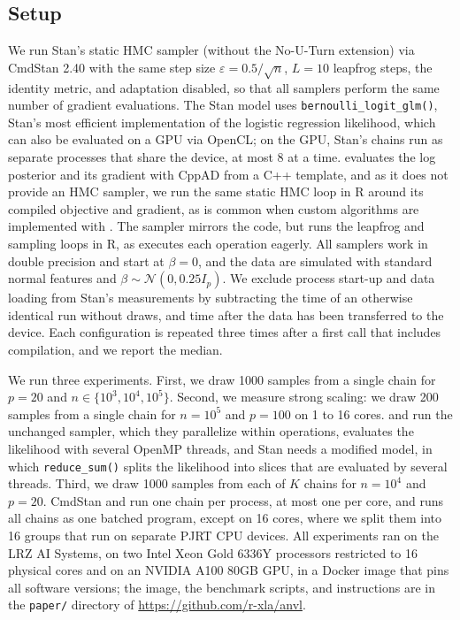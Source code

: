 \subsection{Setup}\label{setup}

We run Stan's static HMC sampler (without the No-U-Turn extension) via CmdStan 2.40 with the same step size \(\varepsilon = 0.5/\sqrt{n}\), \(L = 10\) leapfrog steps, the identity metric, and adaptation disabled, so that all samplers perform the same number of gradient evaluations.
The Stan model uses \texttt{bernoulli\_logit\_glm()}, Stan's most efficient implementation of the logistic regression likelihood, which can also be evaluated on a GPU via OpenCL; on the GPU, Stan's chains run as separate processes that share the device, at most 8 at a time.
 evaluates the log posterior and its gradient with CppAD from a C++ template, and as it does not provide an HMC sampler, we run the same static HMC loop in R around its compiled objective and gradient, as is common when custom algorithms are implemented with .
The  sampler mirrors the  code, but runs the leapfrog and sampling loops in R, as  executes each operation eagerly.
All samplers work in double precision and start at \(\beta = 0\), and the data are simulated with standard normal features and \(\beta \sim \mathcal{N}(0, 0.25 I_p)\).
We exclude process start-up and data loading from Stan's measurements by subtracting the time of an otherwise identical run without draws, and time  after the data has been transferred to the device.
Each configuration is repeated three times after a first call that includes compilation, and we report the median.

We run three experiments.
First, we draw 1000 samples from a single chain for \(p = 20\) and \(n \in \{10^3, 10^4, 10^5\}\).
Second, we measure strong scaling: we draw 200 samples from a single chain for \(n = 10^5\) and \(p = 100\) on 1 to 16 cores.
 and  run the unchanged sampler, which they parallelize within operations,  evaluates the likelihood with several OpenMP threads, and Stan needs a modified model, in which \texttt{reduce\_sum()} splits the likelihood into slices that are evaluated by several threads.
Third, we draw 1000 samples from each of \(K\) chains for \(n = 10^4\) and \(p = 20\).
CmdStan and  run one chain per process, at most one per core, and  runs all chains as one batched program, except on 16 cores, where we split them into 16 groups that run on separate PJRT CPU devices.
All experiments ran on the LRZ AI Systems, on two Intel Xeon Gold 6336Y processors restricted to 16 physical cores and on an NVIDIA A100 80GB GPU, in a Docker image that pins all software versions; the image, the benchmark scripts, and instructions are in the \texttt{paper/} directory of \url{https://github.com/r-xla/anvl}.

